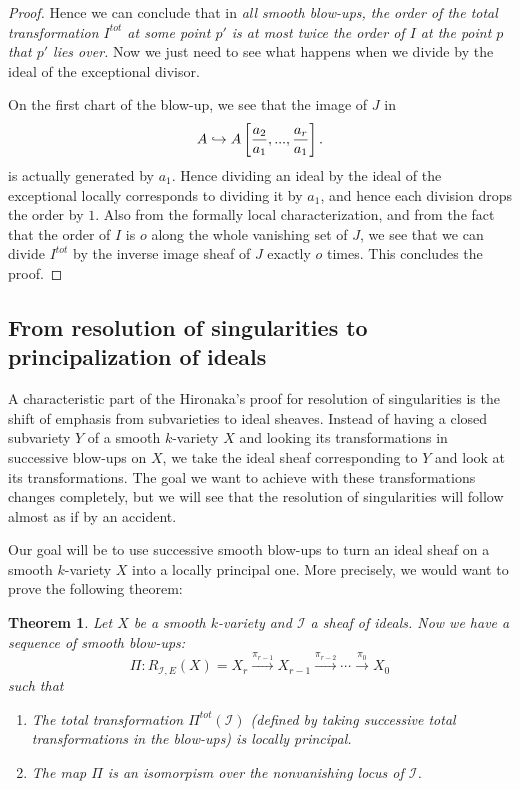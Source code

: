 \documentclass[12pt,a4paper,leqno]{article}
\theoremstyle{plain}
\newtheorem{thm}[theo]{Theorem}
\theoremstyle{definition}
\theoremstyle{remark}
\begin{document}
\begin{proof}
Hence we can conclude that in \emph{all smooth blow-ups, the order of the total transformation $I^{tot}$ at some point $p'$ is at most twice the order of $I$ at the point $p$ that $p'$ lies over.} Now we just need to see what happens when we divide by the ideal of the exceptional divisor.

On the first chart of the blow-up, we see that the image of $J$ in
\begin{equation*}
A \hookrightarrow A \left[ {a_2 \over a_1}, ... , {a_r \over a_1} \right].
\end{equation*}
is actually generated by $a_1$. Hence dividing an ideal by the ideal of the exceptional locally corresponds to dividing it by $a_1$, and hence each division drops the order by $1$. Also from the formally local characterization, and from the fact that the order of $I$ is $o$ along the whole vanishing set of $J$, we see that we can divide $I^{tot}$ by the inverse image sheaf of $J$ exactly $o$ times. This concludes the proof.  
\end{proof} 
 
\subsection{From resolution of singularities to principalization of ideals} 

A characteristic part of the Hironaka's proof for resolution of singularities is the shift of emphasis from subvarieties to ideal sheaves. Instead of having a closed subvariety $Y$ of a smooth $k$-variety $X$ and looking its transformations in successive blow-ups on $X$, we take the ideal sheaf corresponding to $Y$ and look at its transformations. The goal we want to achieve with these transformations changes completely, but we will see that the resolution of singularities will follow almost as if by an accident.

Our goal will be to use successive smooth blow-ups to turn an ideal sheaf on a smooth $k$-variety $X$ into a locally principal one. More precisely, we would want to prove the following theorem:

\begin{thm}
Let $X$ be a smooth $k$-variety and $\mathscr{I}$ a sheaf of ideals. Now we have a sequence of smooth blow-ups:
\begin{equation*}
\Pi: R_{\mathscr{I},E} (X) = X_r \stackrel{\pi_{r-1}}{\to} X_{r-1} \stackrel{\pi_{r-2}}{\to} \cdots \stackrel{\pi_{0}}{\to} X_0
\end{equation*}
such that 
\begin{enumerate}
\item The total transformation $\Pi^{tot} (\mathscr{I})$ (defined by taking successive total transformations in the blow-ups) is locally principal.
\item The map $\Pi$ is an isomorpism over the nonvanishing locus of $\mathscr{I}$.
\end{enumerate}
\end{thm} 
\end{document}
